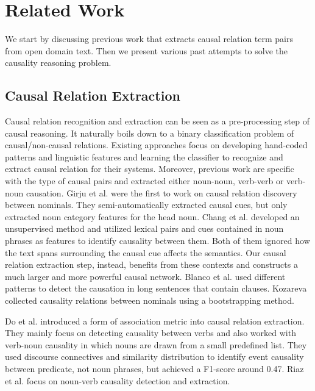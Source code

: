 \section{Related Work}
\label{sec:related}

We start by discussing previous work that extracts causal relation term
pairs from open domain text. Then we present various past attempts to
solve the causality reasoning problem.

\subsection{Causal Relation Extraction}
Causal relation recognition and extraction
can be seen as a pre-processing step of causal reasoning.
It naturally boils down to a binary classification problem of
causal/non-causal relations. Existing approaches focus on developing
hand-coded patterns and linguistic features and learning the
classifier to recognize and extract causal relation for their
systems.
Moreover, previous work are specific with
the type of causal pairs and extracted either
noun-noun, verb-verb or verb-noun causation.
Girju et al. \cite{girju2003automatic} were the first to work on
causal relation discovery
between nominals. They semi-automatically extracted causal cues, but only
extracted noun category features for the head noun. Chang et al.
\cite{ChangC04} developed an unsupervised method and
utilized lexical pairs and cues contained in noun phrases as
features to identify causality between them. Both of them ignored
how the text spans surrounding the causal cue
affects the semantics.  Our causal relation extraction
step, instead,  benefits from these contexts and
constructs a much larger and more powerful causal network.
Blanco et al. \cite{blanco2008causal} used
different patterns to detect the causation in long sentences that
contain clauses.
Kozareva~\cite{kozareva2012cause} collected causality relations
between nominals using a bootstrapping method.

Do et al. \cite{do2011minimally} introduced a form of association
metric into causal relation extraction. They mainly focus on
detecting causality between verbs and also worked with verb-noun
causality in which nouns are drawn from a small predefined list.
They used discourse connectives and similarity distribution to
identify event causality between predicate, not noun phrases, but
achieved a F1-score around 0.47. Riaz et al.
\cite{riaz2014recognizing} focus on noun-verb causality detection
and extraction.

